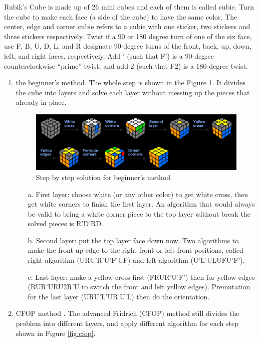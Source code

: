\documentclass{assignment}
\begin{document}
    \begin{homeworkProblem}
    Rubik's Cube is made up of 26 mini cubes and each of them is called cubie. Turn the cube to make each face (a side of the cube) to have the same color. The center, edge and corner cubie refers to a cubie with one sticker, two stickers and three stickers respectively. Twist if a 90 or 180 degree turn of one of the six face,  use F, B, U, D, L, and R designate 90-degree turns of the front, back, up, down, left, and right faces, respectively. Add ' (such that F') is a 90-degree counterclockwise “prime” twist, and add 2 (such that F2) is a 180-degree twist. 
\begin{enumerate}
\item the beginner's method\cite{cube}. The whole step is shown in the Figure \ref{fig:beg}. It divides the cube into layers and solve each layer without messing up the pieces that already in place. 

\begin{figure}[!ht]
\centering
\includegraphics[scale=0.6]{cube1.png}
\caption{Step by step solution for beginner's method}
\label{fig:beg}
\end{figure}
\begin{enumerate}
\item[a.] First layer: choose white (or any other color) to get white cross, then get white corners to finish the first layer. An algorithm that would always be valid to bring a white corner piece to the top layer without break the solved pieces is R'D'RD.
\item[b.] Second layer: put the top layer face down now. Two algorithms to make the front-up edge to the right-front or left-front positions, called right algorithm (URU'R'U'F'UF) and left algorithm (U'L'ULUFU'F').  
\item[c.] Last layer: make a yellow cross first (FRUR'U'F') then for yellow edges (RUR'URU2R'U to switch the front and left yellow edges). Premutation for the last layer (URU'L'UR'U'L) then do the orientation.  
\end{enumerate}
\item CFOP method \cite{cube2}. The advanced Fridrich (CFOP) method still divides the problem into different layers, and apply different algorithm for each step shown in Figure \ref{fig:cfop}.


\end{enumerate}
\end{homeworkProblem}
\end{document}
